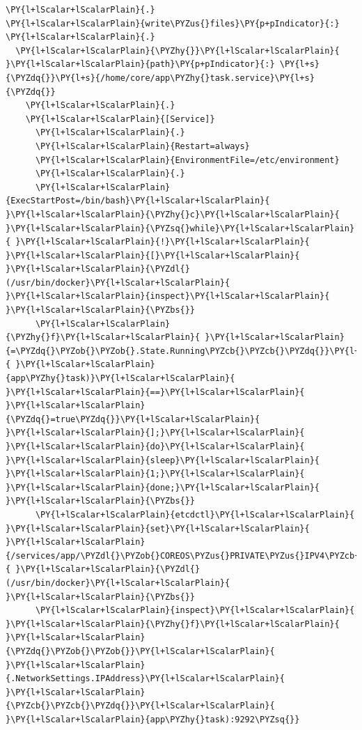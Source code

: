 \begin{codelisting}
\label{code:execstartpost-app-task}
\begin{Verbatim}[fontsize=\relsize{-2.5},fontseries=b,commandchars=\\\{\}]
\PY{l+lScalar+lScalarPlain}{.}
\PY{l+lScalar+lScalarPlain}{write\PYZus{}files}\PY{p+pIndicator}{:}
\PY{l+lScalar+lScalarPlain}{.}
  \PY{l+lScalar+lScalarPlain}{\PYZhy{}}\PY{l+lScalar+lScalarPlain}{ }\PY{l+lScalar+lScalarPlain}{path}\PY{p+pIndicator}{:} \PY{l+s}{\PYZdq{}}\PY{l+s}{/home/core/app\PYZhy{}task.service}\PY{l+s}{\PYZdq{}}
    \PY{l+lScalar+lScalarPlain}{.}
    \PY{l+lScalar+lScalarPlain}{[Service]} 
      \PY{l+lScalar+lScalarPlain}{.}
      \PY{l+lScalar+lScalarPlain}{Restart=always}     
      \PY{l+lScalar+lScalarPlain}{EnvironmentFile=/etc/environment}
      \PY{l+lScalar+lScalarPlain}{.}
      \PY{l+lScalar+lScalarPlain}{ExecStartPost=/bin/bash}\PY{l+lScalar+lScalarPlain}{ }\PY{l+lScalar+lScalarPlain}{\PYZhy{}c}\PY{l+lScalar+lScalarPlain}{ }\PY{l+lScalar+lScalarPlain}{\PYZsq{}while}\PY{l+lScalar+lScalarPlain}{ }\PY{l+lScalar+lScalarPlain}{!}\PY{l+lScalar+lScalarPlain}{ }\PY{l+lScalar+lScalarPlain}{[}\PY{l+lScalar+lScalarPlain}{ }\PY{l+lScalar+lScalarPlain}{\PYZdl{}(/usr/bin/docker}\PY{l+lScalar+lScalarPlain}{ }\PY{l+lScalar+lScalarPlain}{inspect}\PY{l+lScalar+lScalarPlain}{ }\PY{l+lScalar+lScalarPlain}{\PYZbs{}}
      \PY{l+lScalar+lScalarPlain}{\PYZhy{}f}\PY{l+lScalar+lScalarPlain}{ }\PY{l+lScalar+lScalarPlain}{=\PYZdq{}\PYZob{}\PYZob{}.State.Running\PYZcb{}\PYZcb{}\PYZdq{}}\PY{l+lScalar+lScalarPlain}{ }\PY{l+lScalar+lScalarPlain}{app\PYZhy{}task)}\PY{l+lScalar+lScalarPlain}{ }\PY{l+lScalar+lScalarPlain}{==}\PY{l+lScalar+lScalarPlain}{ }\PY{l+lScalar+lScalarPlain}{\PYZdq{}=true\PYZdq{}}\PY{l+lScalar+lScalarPlain}{ }\PY{l+lScalar+lScalarPlain}{];}\PY{l+lScalar+lScalarPlain}{ }\PY{l+lScalar+lScalarPlain}{do}\PY{l+lScalar+lScalarPlain}{ }\PY{l+lScalar+lScalarPlain}{sleep}\PY{l+lScalar+lScalarPlain}{ }\PY{l+lScalar+lScalarPlain}{1;}\PY{l+lScalar+lScalarPlain}{ }\PY{l+lScalar+lScalarPlain}{done;}\PY{l+lScalar+lScalarPlain}{ }\PY{l+lScalar+lScalarPlain}{\PYZbs{}}
      \PY{l+lScalar+lScalarPlain}{etcdctl}\PY{l+lScalar+lScalarPlain}{ }\PY{l+lScalar+lScalarPlain}{set}\PY{l+lScalar+lScalarPlain}{ }\PY{l+lScalar+lScalarPlain}{/services/app/\PYZdl{}\PYZob{}COREOS\PYZus{}PRIVATE\PYZus{}IPV4\PYZcb{}}\PY{l+lScalar+lScalarPlain}{ }\PY{l+lScalar+lScalarPlain}{\PYZdl{}(/usr/bin/docker}\PY{l+lScalar+lScalarPlain}{ }\PY{l+lScalar+lScalarPlain}{\PYZbs{}}
      \PY{l+lScalar+lScalarPlain}{inspect}\PY{l+lScalar+lScalarPlain}{ }\PY{l+lScalar+lScalarPlain}{\PYZhy{}f}\PY{l+lScalar+lScalarPlain}{ }\PY{l+lScalar+lScalarPlain}{\PYZdq{}\PYZob{}\PYZob{}}\PY{l+lScalar+lScalarPlain}{ }\PY{l+lScalar+lScalarPlain}{.NetworkSettings.IPAddress}\PY{l+lScalar+lScalarPlain}{ }\PY{l+lScalar+lScalarPlain}{\PYZcb{}\PYZcb{}\PYZdq{}}\PY{l+lScalar+lScalarPlain}{ }\PY{l+lScalar+lScalarPlain}{app\PYZhy{}task):9292\PYZsq{}}

\end{Verbatim}
\end{codelisting}
